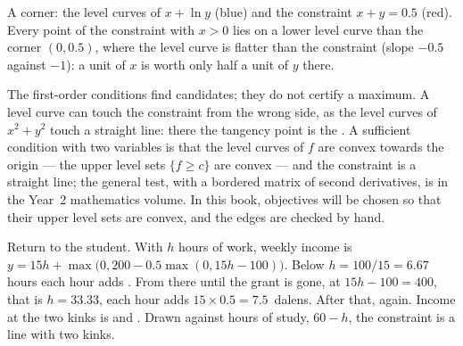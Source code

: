 \begin{omfigure}

{\small A corner: the level curves of $x + \ln y$ (blue) and the constraint
$x + y = 0.5$ (red). Every point of the constraint with $x > 0$ lies on a
lower level curve than the corner $(0, 0.5)$, where the level curve is flatter
than the constraint (slope $-0.5$ against $-1$): a unit of $x$ is worth only half
a unit of $y$ there.}
\end{omfigure}

The first-order conditions find candidates; they do not certify a maximum.
A level curve can touch the constraint from the wrong side, as the level
curves of $x^2 + y^2$ touch a straight line: there the tangency point is the
. A sufficient condition with two variables is that the
level curves of $f$ are convex towards the origin --- the upper level sets
$\{f \ge c\}$ are convex --- and the constraint is a straight line; the
general test, with a bordered matrix of second derivatives, is in the Year~2
mathematics volume. In this book, objectives will be chosen so that their
upper level sets are convex, and the edges are checked by hand.

Return to the student. With $h$ hours of work, weekly income is
$y = 15h + \max\bigl(0, 200 - 0.5\max(0, 15h - 100)\bigr)$. Below
$h = 100/15 = 6.67$ hours each hour adds . From there until the grant
is gone, at $15h - 100 = 400$, that is $h = 33.33$, each hour adds
$15 \times 0.5 = \num{7.5}$~dalens. After that,  again. Income at the two
kinks is  and . Drawn against hours of study, $60 - h$, the
constraint is a line with two kinks.

